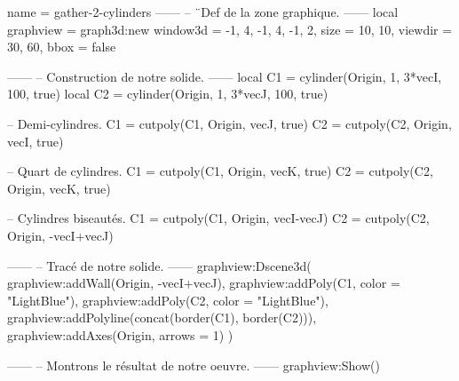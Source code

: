 \documentclass{standalone}
\begin{document}
\begin{luadraw*}{name = gather-2-cylinders}
------
-- ¨Def de la zone graphique.
------
local graphview = graph3d:new{
  window3d = {-1, 4, -1, 4, -1, 2},
  size     = {10, 10},
  viewdir  = {30, 60},
  bbox     = false
}

------
-- Construction de notre solide.
------
local C1 = cylinder(Origin, 1, 3*vecI, 100, true)
local C2 = cylinder(Origin, 1, 3*vecJ, 100, true)

-- Demi-cylindres.
C1 = cutpoly(C1, {Origin, vecJ}, true)
C2 = cutpoly(C2, {Origin, vecI}, true)

-- Quart de cylindres.
C1 = cutpoly(C1, {Origin, vecK}, true)
C2 = cutpoly(C2, {Origin, vecK}, true)

-- Cylindres biseautés.
C1 = cutpoly(C1, {Origin, vecI-vecJ})
C2 = cutpoly(C2, {Origin, -vecI+vecJ})

------
-- Tracé de notre solide.
------
graphview:Dscene3d(
  graphview:addWall({Origin, -vecI+vecJ}),
  graphview:addPoly(C1, {color = "LightBlue"}),
  graphview:addPoly(C2, {color = "LightBlue"}),
  graphview:addPolyline(concat(border(C1), border(C2))),
  graphview:addAxes(Origin, {arrows = 1})
)

------
-- Montrons le résultat de notre oeuvre.
------
graphview:Show()
\end{luadraw*}
\end{document}
